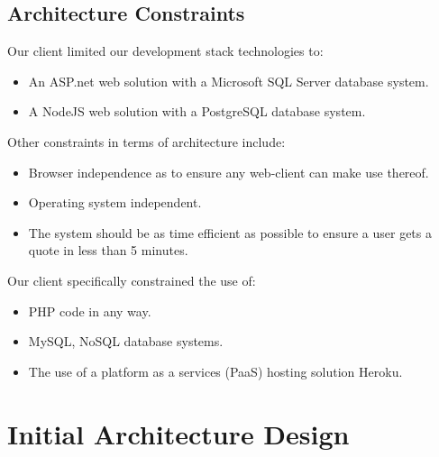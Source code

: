 \documentclass{article}
\begin{document}
	\subsection{Architecture Constraints}
	Our client limited our development stack technologies to:
	\begin{itemize}
		\item An ASP.net web solution with a Microsoft SQL Server database system.
		\item A NodeJS web solution with a PostgreSQL database system.
	\end{itemize}
	Other constraints in terms of architecture include:
	\begin{itemize}
		\item Browser independence as to ensure any web-client can make use thereof.
		\item Operating system independent.
		\item The system should be as time efficient as possible to ensure a user gets a quote in less than 5 minutes.
		\end{itemize}
	Our client specifically constrained the use of:
		\begin{itemize}
		\item PHP code in any way.
		\item MySQL, NoSQL database systems.
		\item The use of a platform as a services (PaaS) hosting solution Heroku.
		\end{itemize}
	
	\section{Initial Architecture Design}


	


	
\end{document}
